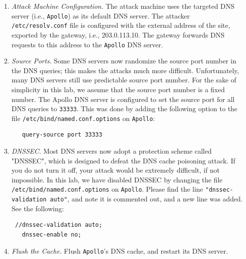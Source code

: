\begin{enumerate}

\item {\em Attack Machine Configuration.} 
The attack machine uses the targeted 
DNS server (i.e., {\tt Apollo}) as its default DNS server. 
The attacker {\tt /etc/resolv.conf} file is configured with the external
address of the site, exported by the gateway, i.e., 203.0.113.10.
The gateway forwards DNS requests to this address to the {\tt Apollo} DNS server.

\item {\em Source Ports.} Some DNS servers now randomize the source port number 
in the DNS queries; this makes the attacks much more difficult. Unfortunately, 
many DNS servers still use predictable source port number.  
For the sake of simplicity in this lab, we assume that the source port 
number is a fixed number. The Apollo DNS server is configured to set
the source port for all DNS queries 
to {\tt 33333}. This was done by adding the following option to the file {\tt /etc/bind/named.conf.options}
on {\tt Apollo}:
\begin{verbatim}
   query-source port 33333
\end{verbatim}

\item {\em DNSSEC.}
Most DNS servers now adopt a protection scheme called "DNSSEC", which is
designed to defeat the DNS cache poisoning attack.  If you do not turn
it off, your attack would be extremely difficult, if not impossible.
In this lab, we have disabled DNSSEC by changing 
the file {\tt /etc/bind/named.conf.options} on {\tt Apollo}. Please find the line 
{\tt "dnssec-validation auto"}, and note it is commented out, and a new line was added. See
the following:
\begin{verbatim}
 //dnssec-validation auto;
   dnssec-enable no;
\end{verbatim}


\item {\em Flush the Cache.}
Flush {\tt Apollo}'s  DNS cache, and restart its DNS server. 
\end{enumerate}


